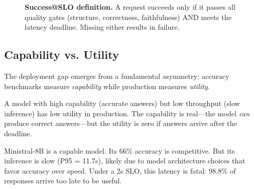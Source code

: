\documentclass[11pt]{article}
\begin{document}
\begin{figure}[t]
\centering
{}
\caption{\textbf{Success@SLO definition.} A request succeeds only if it passes all quality gates (structure, correctness, faithfulness) AND meets the latency deadline. Missing either results in failure.}
\label{fig:success-at-slo}
\end{figure}

\subsection{Capability vs. Utility}

The deployment gap emerges from a fundamental asymmetry: accuracy benchmarks measure \emph{capability} while production measures \emph{utility}.

A model with high capability (accurate answers) but low throughput (slow inference) has low utility in production.
The capability is real---the model \emph{can} produce correct answers---but the utility is zero if answers arrive after the deadline.

Ministral-8B is a capable model.
Its 66\% accuracy is competitive.
But its inference is slow (P95 = 11.7s), likely due to model architecture choices that favor accuracy over speed.
Under a 2s SLO, this latency is fatal: 98.8\% of responses arrive too late to be useful.
\end{document}
